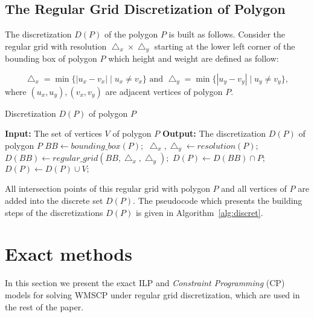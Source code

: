 \documentclass[runningheads,a4paper]{elsarticle}
\begin{document}
	
	\subsection{The Regular Grid Discretization of Polygon}\label{sec:regulardiscretization}
	The discretization $D(P)$ of the polygon $P$ is built as follows. Consider the regular grid with resolution $\bigtriangleup_{x}\times\bigtriangleup_{y}$ starting at the lower left corner of the bounding box of polygon $P$ which height and weight are defined as follow:

	\begin{equation}
         \bigtriangleup_{x}=\min\{ |u_{x}-v_{x}|\mid u_{x}\neq v_{x}\} \mbox{ and }
         \bigtriangleup_{y}=\min\{ |u_{y}-v_{y}|\mid u_{y}\neq v_{y}\},
 	\end{equation}
where $ (u_{x},u_{y}),(v_{x},v_{y})$ are adjacent vertices of polygon $P$.
	
	\begin{algorithm}[!t]
		\caption{Discretization $D(P)$ of polygon $P$}\label{alg:discret}
		\begin{algorithmic}[1]
			\State \textbf{Input:} The set of vertices $V$ of polygon $P$
			\State \textbf{Output:} The discretization $D(P)$ of polygon $P$
			\State $BB \gets bounding\_box(P);$
			\State $\bigtriangleup_{x},\bigtriangleup_{y} \gets resolution(P);$
			\State $D(BB) \gets regular\_grid(BB,\bigtriangleup_{x},\bigtriangleup_{y});$
			\State $D(P) \gets D(BB) \cap P;$
			\State $D(P) \gets D(P) \cup V;$
		\end{algorithmic}
	\end{algorithm}

	All intersection points of this regular grid with polygon $P$ and all vertices of $P$ are added into the discrete set $D(P)$. The pseudocode which presents the building steps of the discretizations $D(P)$ is given in Algorithm~\ref{alg:discret}.
	
	
	\section{Exact methods}
	In this section we present the exact ILP and \emph{Constraint Programming} (CP) models for solving WMSCP  under regular grid discretization, which are used  in the rest of the paper.
\end{document}
